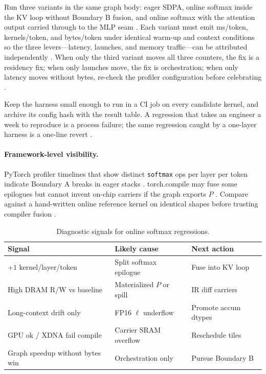 Run three variants in the same graph body: eager SDPA, online softmax inside the KV loop without Boundary B fusion, and online softmax with the attention output carried through to the MLP seam \citep{dao2022flashattention,chen2020compilerbasedhardw}. Each variant must emit ms/token, kernels/token, and bytes/token under identical warm-up and context conditions so the three levers---latency, launches, and memory traffic---can be attributed independently \citep{memoryfloor2026,taxbreak2026}. When only the third variant moves all three counters, the fix is a residency fix; when only launches move, the fix is orchestration; when only latency moves without bytes, re-check the profiler configuration before celebrating \citep{patel2025llminference,kwon2023vllm}.

Keep the harness small enough to run in a CI job on every candidate kernel, and archive its config hash with the result table. A regression that takes an engineer a week to reproduce is a process failure; the same regression caught by a one-layer harness is a one-line revert \citep{yirage2026,dao2023flashdecoding}.

\paragraph{Framework-level visibility.} PyTorch profiler timelines that show distinct \texttt{softmax} ops per layer per token indicate Boundary A breaks in eager stacks \citep{dlbook,taxbreak2026}. torch.compile may fuse some epilogues but cannot invent on-chip carriers if the graph exports $P$ \citep{chen2020compilerbasedhardw,patel2025llminference}. Compare against a hand-written online reference kernel on identical shapes before trusting compiler fusion \citep{dao2022flashattention,yirage2026}.

\begin{table}[t]
\centering
\caption{Diagnostic signals for online softmax regressions.}
\label{tab:ch10_diagnostics}
\begin{tabular}{p{1.4in}p{2.0in}p{1.6in}}
\toprule
\textbf{Signal} & \textbf{Likely cause} & \textbf{Next action} \\
\midrule
+$1$ kernel/layer/token & Split softmax epilogue & Fuse into KV loop \\
High DRAM R/W vs baseline & Materialized $P$ or spill & IR diff carriers \\
Long-context drift only & FP16 $\ell$ underflow & Promote accum dtypes \\
GPU ok / XDNA fail compile & Carrier SRAM overflow & Reschedule tiles \\
Graph speedup without bytes win & Orchestration only & Pursue Boundary B \\
\bottomrule
\end{tabular}
\end{table}


